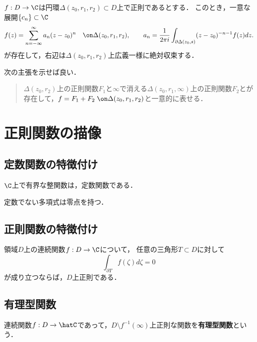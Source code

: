 \documentclass[uplatex, dvipdfmx]{jsreport}
\begin{document}
\begin{theorem}
    $f:D\to\C$は円環$\Delta(z_0,r_1,r_2)\subset D$上で正則であるとする．
    このとき，一意な展開$\{c_n\}\subset\C$
    \[f(z)=\sum^\infty_{n=-\infty}a_n(z-z_0)^n\quad\on\Delta(z_0,r_1,r_2),\qquad a_n=\frac{1}{2\pi i}\int_{\partial\Delta(z_0,s)}(z-z_0)^{-n-1}f(z)dz.\]
    が存在して，右辺は$\Delta(z_0,r_1,r_2)$上広義一様に絶対収束する．
\end{theorem}
\begin{Proof}
    次の主張を示せば良い．
    \begin{quote}
        $\Delta(z_0,r_2)$上の正則関数$F_1$と$\infty$で消える$\Delta(z_0,r_1,\infty)$上の正則関数$F_2$とが存在して，$f=F_1+F_2\;\on\Delta(z_0,r_1,r_2)$と一意的に表せる．
    \end{quote}
\end{Proof}

\section{正則関数の描像}

\subsection{定数関数の特徴付け}

\begin{corollary}[Liouville]
    $\C$上で有界な整関数は，定数関数である．
\end{corollary}

\begin{corollary}[代数学の基本定理]
    定数でない多項式は零点を持つ．
\end{corollary}

\subsection{正則関数の特徴付け}

\begin{corollary}[Morera]
    領域$D$上の連続関数$f:D\to\C$について，
    任意の三角形$T\subset D$に対して
    \[\int_{\partial T}f(\zeta)d\zeta=0\]
    が成り立つならば，$D$上正則である．
\end{corollary}

\subsection{有理型関数}

\begin{definition}
    連続関数$f:D\to\hatC$であって，$D\setminus f^{-1}(\infty)$上正則な関数を\textbf{有理型関数}という．
\end{definition}
\end{document}
